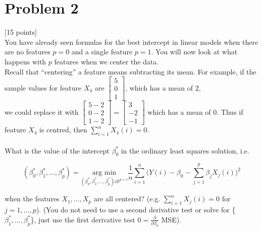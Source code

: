 \documentclass[12pt]{article}
\begin{document}
\section{Problem 2}
 [15 points]\\
You have already seen formulas for the best intercept in linear models when there are no
features $p = 0$ and a single feature $p = 1$. You will now look at what happens with $p$ features
when we center the data.\\
Recall that “centering” a feature means subtracting its mean. For example, if the sample values
for feature $X_4$ are $\begin{bmatrix} 5 \\0\\1\end{bmatrix}$, which has a mean of $2$, \\we could replace it with $\begin{bmatrix} 5 - 2\\0 - 2\\1 - 2\end{bmatrix} = \begin{bmatrix} 3\\-2\\-1\end{bmatrix}$ which has a mean of $0$. Thus if feature $X_4$ is centred, then $\sum^n_{i=1}X_4(i) = 0$.\\\\

What is the value of the intercept $\beta^*_0$ in the ordinary least squares solution, i.e.
\begin{center}
    \[
        (\beta^*_0, \beta^*_1, \dots, \beta^*_p) = \underset{(\beta^*_0, \beta^*_1, \dots, \beta^*_p)\epsilon\mathbb{R}^{p+1}}{\text{arg min}}\frac{1}{n}\sum_{i = 1}^{n} \bigg( Y(i) - \beta_0 - \sum_{j=1}^p\beta_jX_j(i)\bigg) ^2
    \]
\end{center}
when the features ${X_1, \dots, X_p}$ are all centered? (e.g. $\sum_{i=1}^nX_j(i) = 0$ for $ j = 1, \dots, p$). (You do not need to use a second derivative test or solve for \{$\beta_1^*, \dots, \beta_p^*$\}, just use the first derivative test $0 = \frac{\partial}{\partial\beta_0}$ MSE).\\\\
\end{document}
